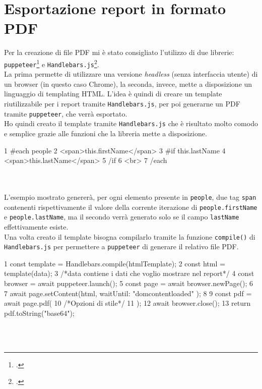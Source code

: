 \section{Esportazione report in formato PDF}
Per la creazione di file PDF mi è stato consigliato l'utilizzo di due librerie: \texttt{puppeteer}\footcite{site:puppeteer} e \texttt{Handlebars.js}\footcite{site:handlebars}.\\
La prima permette di utilizzare una versione \textit{headless} (senza interfaccia utente) di un browser (in questo caso Chrome), la seconda, invece, mette a disposizione un linguaggio di templating HTML. L'idea è quindi di creare un template riutilizzabile per i report tramite \texttt{Handlebars.js}, per poi generarne un PDF tramite \texttt{puppeteer}, che verrà esportato.\\
Ho quindi creato il template tramite \texttt{Handlebars.js} che è risultato molto comodo e semplice grazie alle funzioni che la libreria mette a disposizione.

\begin{code}[frame=tb,title={Esempio di utilizzo di Handlebars.js}]
1 {{#each people}}
2   <span>{{this.firstName}}</span> 
3   {{#if this.lastName}}
4     <span>{{this.lastName}}</span>
5   {{/if}}
6   <br>
7 {{/each}} 
\end{code}\\\\

\noindent L'esempio mostrato genererà, per ogni elemento presente in \texttt{people}, due tag \texttt{span} contenenti rispettivamente il valore della corrente iterazione di \texttt{people.firstName} e \texttt{people.lastName}, ma il secondo verrà generato solo se il campo \texttt{lastName} effettivamente esiste.\\
Una volta creato il template bisogna compilarlo tramite la funzione \texttt{compile()} di \texttt{Handlebars.js} per permettere a \texttt{puppeteer} di generare il relativo file PDF.

\begin{code}[frame=tb,title={Esempio di utilizzo di puppeteer per la creazione di file PDF}]
1   const template = Handlebars.compile(htmlTemplate);
2   const html = template(data);  
3   /*data contiene i dati che voglio mostrare nel report*/
4   const browser = await puppeteer.launch();
5   const page = await browser.newPage();
6 
7   await page.setContent(html, { waitUntil: "domcontentloaded" });
8 
9   const pdf = await page.pdf({
10     /*Opzioni di stile*/
11  });
12  await browser.close();
13  return pdf.toString("base64");
\end{code}\\\\

